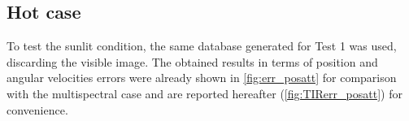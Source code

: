 \subsection*{Hot case}
To test the sunlit condition, the same database generated for Test 1 was used, discarding the visible image. The obtained results in terms of position and angular velocities errors were already shown in \cref{fig:err_posatt} for comparison with the multispectral case and are reported hereafter (\cref{fig:TIRerr_posatt}) for convenience.


